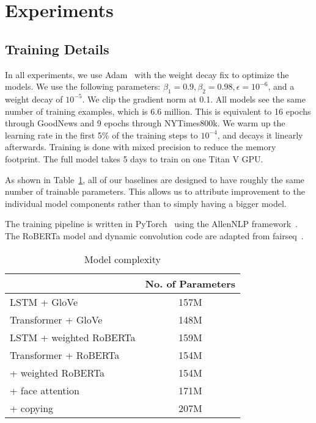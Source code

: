 

\section{Experiments}

\subsection{Training Details}

In all experiments, we use Adam~\cite{Kingma2015Adam} with the weight decay fix
\cite{Loshchilov2018DecoupledWD} to optimize the models. We use the following
parameters: $\beta_1 = 0.9, \beta_2 = 0.98, \epsilon = 10^{-6}$, and a weight
decay of $10^{-5}$. We clip the gradient norm at 0.1. All models see the same
number of training examples, which is 6.6 million. This is equivalent to 16
epochs through GoodNews and 9 epochs through NYTimes800k. We warm up the
learning rate in the first 5\% of the training steps to $10^{-4}$, and decays
it linearly afterwards. Training is done with mixed precision to reduce the
memory footprint. The full model takes 5 days to train on one Titan V GPU.

As shown in Table~\ref{tab:models}, all of our baselines are designed to have
roughly the same number of trainable parameters. This allows us to attribute
improvement to the individual model components rather than to simply having a
bigger model.

The training pipeline is written in PyTorch~\cite{Paszke2017Automatic} using
the AllenNLP framework~\cite{Gardner2017AllenNLP}. The RoBERTa model and
dynamic convolution code are adapted from fairseq~\cite{Ott2019Fairseq}.

\begin{table}[t]
	\caption {Model complexity}
	\label{tab:models}
	\centering
	\begin{tabularx}{\linewidth}{Xc}
		\toprule
        & No. of Parameters \\
      \midrule
      LSTM + GloVe & 157M \\
      Transformer + GloVe & 148M \\
      LSTM + weighted RoBERTa & 159M \\
      \midrule
      Transformer + RoBERTa & 154M \\
      \quad + weighted RoBERTa & 154M \\
      \quad\quad + face attention & 171M \\
      \quad\quad\quad + copying & 207M \\
		\bottomrule
	\end{tabularx}
\end{table}

